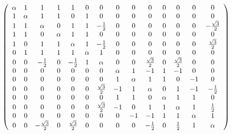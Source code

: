 \[
\left(
\begin{array}{ccccccc ccccccc}
 \alpha  & 1 & 1 & 1 & 1 & 0 & 0 & 0 & 0 & 0 & 0 & 0 & 0 & 0 \\
 1 & \alpha  & 1 & 1 & 0 & 1 & 0 & 0 & 0 & 0 & 0 & 0 & 0 & 0 \\
 1 & 1 & \alpha  & 0 & 1 & 1 & -\frac{1}{2} & 0 & 0 & 0 & 0 & 0 & 0 & -\frac{\sqrt{3}}{2} \\
 1 & 1 & 0 & \alpha  & 1 & 1 & 0 & 0 & 0 & 0 & 0 & 0 & 0 & 0 \\
 1 & 0 & 1 & 1 & \alpha  & 1 & -\frac{1}{2} & 0 & 0 & 0 & 0 & 0 & 0 & \frac{\sqrt{3}}{2} \\
 0 & 1 & 1 & 1 & 1 & \alpha  & 1 & 0 & 0 & 0 & 0 & 0 & 0 & 0 \\
 0 & 0 & -\frac{1}{2} & 0 & -\frac{1}{2} & 1 & \alpha  & 0 & 0 & \frac{\sqrt{3}}{2} & 0 & \frac{\sqrt{3}}{2} & 0 & 0 
 \\ %
 0 & 0 & 0 & 0 & 0 & 0 & 0 & \alpha  & 1 & -1 & 1 & -1 & 0 & 0 \\
 0 & 0 & 0 & 0 & 0 & 0 & 0 & 1 & \alpha  & 1 & 1 & 0 & -1 & 0 \\
 0 & 0 & 0 & 0 & 0 & 0 & \frac{\sqrt{3}}{2} & -1 & 1 & \alpha  & 0 & 1 & -1 & -\frac{1}{2} \\
 0 & 0 & 0 & 0 & 0 & 0 & 0 & 1 & 1 & 0 & \alpha  & 1 & 1 & 0 \\
 0 & 0 & 0 & 0 & 0 & 0 & \frac{\sqrt{3}}{2} & -1 & 0 & 1 & 1 & \alpha  & 1 & \frac{1}{2} \\
 0 & 0 & 0 & 0 & 0 & 0 & 0 & 0 & -1 & -1 & 1 & 1 & \alpha  & 1 \\
 0 & 0 & -\frac{\sqrt{3}}{2} & 0 & \frac{\sqrt{3}}{2} & 0 & 0 & 0 & 0 & -\frac{1}{2} & 0 & \frac{1}{2} & 1 & \alpha 
\end{array}
\right)
\]